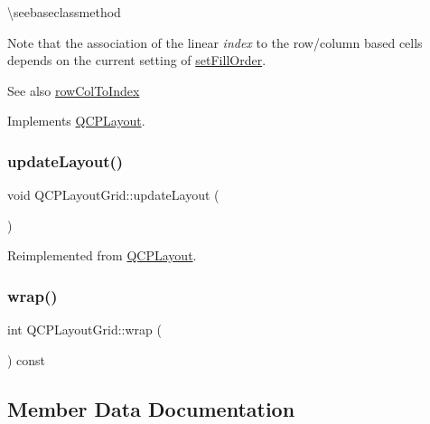 \textbackslash{}seebaseclassmethod

Note that the association of the linear {\itshape index} to the row/column based cells depends on the current setting of \mbox{\hyperlink{class_q_c_p_layout_grid_affc2f3cfd22f28698c5b29b960d2a391}{set\+Fill\+Order}}.

\begin{DoxySeeAlso}{See also}
\mbox{\hyperlink{class_q_c_p_layout_grid_a682ba76f130810ffd294032a1bfbcfcb}{row\+Col\+To\+Index}} 
\end{DoxySeeAlso}


Implements \mbox{\hyperlink{class_q_c_p_layout_a5a79621fa0a6eabb8b520cfc04fb601a}{Q\+C\+P\+Layout}}.

\mbox{\label{class_q_c_p_layout_grid_a6cf43f14d3fa335fd8758561ccf1f78c}} 
\subsubsection{\texorpdfstring{updateLayout()}{updateLayout()}}
{\footnotesize\ttfamily void Q\+C\+P\+Layout\+Grid\+::update\+Layout (\begin{DoxyParamCaption}{ }\end{DoxyParamCaption})\hspace{0.3cm}{\ttfamily [virtual]}}



Reimplemented from \mbox{\hyperlink{class_q_c_p_layout_a165c77f6287ac92e8d03017ad913378b}{Q\+C\+P\+Layout}}.

\mbox{\label{class_q_c_p_layout_grid_a8bb71b52b2796c9f05fae6a32d2d0efd}} 
\subsubsection{\texorpdfstring{wrap()}{wrap()}}
{\footnotesize\ttfamily int Q\+C\+P\+Layout\+Grid\+::wrap (\begin{DoxyParamCaption}{ }\end{DoxyParamCaption}) const\hspace{0.3cm}{\ttfamily [inline]}}



\subsection{Member Data Documentation}
\mbox{\label{class_q_c_p_layout_grid_ae9ac48f0791be07ead0a96dbd5622770}} 
